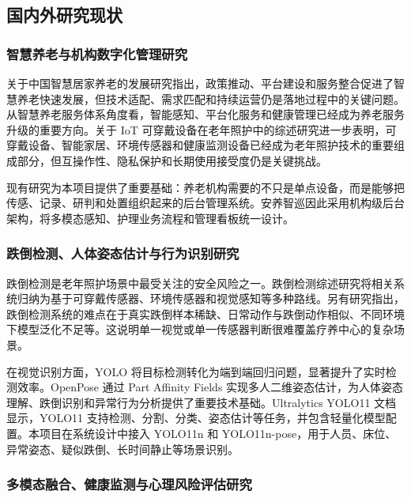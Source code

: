 \documentclass[UTF8,a4paper,zihao=-4,fontset=fandol]{ctexart}
\begin{document}
\subsection{国内外研究现状}

\subsubsection{智慧养老与机构数字化管理研究}

关于中国智慧居家养老的发展研究指出，政策推动、平台建设和服务整合促进了智慧养老快速发展，但技术适配、需求匹配和持续运营仍是落地过程中的关键问题\cite{zhang2020smart}。从智慧养老服务体系角度看，智能感知、平台化服务和健康管理已经成为养老服务升级的重要方向\cite{hung2023smart}。关于 IoT 可穿戴设备在老年照护中的综述研究进一步表明，可穿戴设备、智能家居、环境传感器和健康监测设备已经成为老年照护技术的重要组成部分，但互操作性、隐私保护和长期使用接受度仍是关键挑战\cite{stavropoulos2020iot}。

现有研究为本项目提供了重要基础：养老机构需要的不只是单点设备，而是能够把传感、记录、研判和处置组织起来的后台管理系统。安养智巡因此采用机构级后台架构，将多模态感知、护理业务流程和管理看板统一设计。

\subsubsection{跌倒检测、人体姿态估计与行为识别研究}

跌倒检测是老年照护场景中最受关注的安全风险之一。跌倒检测综述研究将相关系统归纳为基于可穿戴传感器、环境传感器和视觉感知等多种路线\cite{mubashir2013survey}。另有研究指出，跌倒检测系统的难点在于真实跌倒样本稀缺、日常动作与跌倒动作相似、不同环境下模型泛化不足等\cite{igual2013challenges}。这说明单一视觉或单一传感器判断很难覆盖疗养中心的复杂场景。

在视觉识别方面，YOLO 将目标检测转化为端到端回归问题，显著提升了实时检测效率\cite{redmon2016yolo}。OpenPose 通过 Part Affinity Fields 实现多人二维姿态估计，为人体姿态理解、跌倒识别和异常行为分析提供了重要技术基础\cite{cao2017realtime}。Ultralytics YOLO11 文档显示，YOLO11 支持检测、分割、分类、姿态估计等任务，并包含轻量化模型配置\cite{ultralytics2024yolo11}。本项目在系统设计中接入 YOLO11n 和 YOLO11n-pose，用于人员、床位、异常姿态、疑似跌倒、长时间静止等场景识别。

\subsubsection{多模态融合、健康监测与心理风险评估研究}
\end{document}
